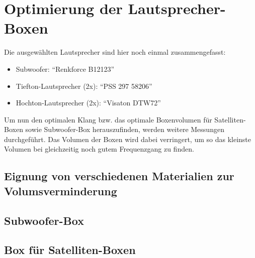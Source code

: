 \newpage
\section{Optimierung der Lautsprecher-Boxen}\label{sec:4.4}
Die ausgewählten Lautsprecher sind hier noch einmal zusammengefasst:
\begin{itemize}
	\item Subwoofer: \enquote{Renkforce B12123}
	\item Tiefton-Lautsprecher (2x): \enquote{PSS 297 58206}
	\item Hochton-Lautsprecher (2x): \enquote{Visaton DTW72}
\end{itemize}
Um nun den optimalen Klang bzw. das optimale Boxenvolumen für Satelliten-Boxen sowie Subwoofer-Box herauszufinden, werden weitere Messungen durchgeführt.
Das Volumen der Boxen wird dabei verringert, um so das kleinste Volumen bei gleichzeitig noch gutem Frequenzgang zu finden.

\subsection{Eignung von verschiedenen Materialien zur Volumsverminderung}\label{subsec:4.4.1}


\subsection{Subwoofer-Box}\label{subsec:4.4.2}


\subsection{Box für Satelliten-Boxen}\label{subsec:4.4.3}